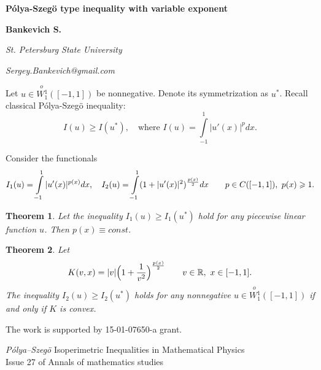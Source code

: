 \documentclass[12pt]{article}
\newtheorem{thm}{Theorem}
\newcommand{\Wf}{\stackrel{o\ }{W{}_1^1}}
\newcommand{\Real}{\mathbb R}
\renewcommand{\ge}{\geqslant}
\begin{document}
\centerline{\large\bf P\'olya-Szeg\"o type inequality with variable exponent}
\medskip
\centerline{\bf Bankevich S.}
\medskip
\centerline{\it St. Petersburg State University}
\centerline{\it Sergey.Bankevich@gmail.com}
\bigskip

Let $u \in \Wf([-1,1])$ be nonnegative.
Denote its symmetrization as $u^*$.
Recall classical P\'olya-Szeg\"o \cite{PS} inequality:
\begin{equation}
\label{ineq}
I(u) \ge I(u^*), \quad \mbox{where } I(u) = \int\limits_{-1}^1 |u'(x)|^p dx.
\end{equation}

Consider the functionals
\begin{equation}
I_1(u) = \int\limits_{-1}^1 |u'(x)|^{p(x)} dx, \quad
I_2(u) = \int\limits_{-1}^1 ( 1 + |u'(x)|^2 )^{p(x) \over 2} dx \qquad
p \in C([-1, 1]),\ p(x) \ge 1.
\end{equation}

\begin{thm}
Let the inequality $I_1(u) \ge I_1(u^*)$ hold for any piecewise linear function $u$.
Then $p(x) \equiv const$.
\end{thm}

\begin{thm}
Let
$$K(v, x) = |v| \Big(1 + {1 \over v^2}\Big)^{p(x) \over 2} \qquad v \in \Real,\ x \in [-1, 1].$$
The inequality $I_2(u) \ge I_2(u^*)$ holds for any nonnegative $u \in \Wf([-1, 1])$ if and only if $K$ is convex.
\end{thm}

The work is supported by 15-01-07650-a grant.

\begin{thebibliography}{100}
 {\it P\'olya--Szeg\"o}
Isoperimetric Inequalities in Mathematical Physics
\\ Issue 27 of Annals of mathematics studies
\end{thebibliography}
\end{document}
